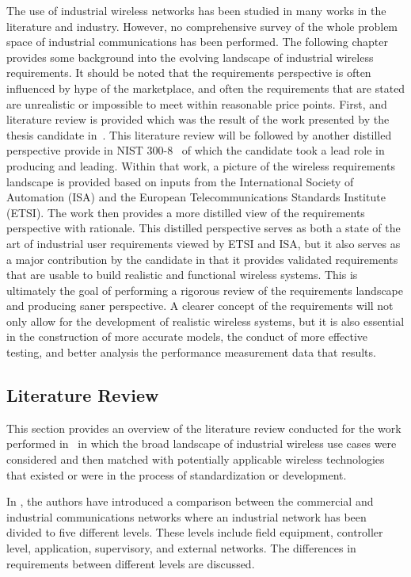 The use of industrial wireless networks has been studied in many works in the literature and industry. However, no comprehensive survey of the whole problem space of industrial communications has been performed.   The following chapter provides some background into the evolving landscape of industrial wireless requirements.  It should be noted that the requirements perspective is often influenced by hype of the marketplace, and often the requirements that are stated are unrealistic or impossible to meet within reasonable price points.  First, and literature review is provided which was the result of the work presented by the thesis candidate in~\cite{CandellRW2017}.  This literature review will be followed by another distilled perspective provide in NIST 300-8~\cite{Montgomery2019} of which the candidate took a lead role in producing and leading.  Within that work, a picture of the wireless requirements landscape is provided based on inputs from the International Society of Automation (ISA) and the European Telecommunications Standards Institute (ETSI).  The work then provides a more distilled view of the requirements perspective with rationale.  This distilled perspective serves as both a state of the art of industrial user requirements viewed by ETSI and ISA, but it also serves as a major contribution by the candidate in that it provides validated requirements that are usable to build realistic and functional wireless systems.  This is ultimately the goal of performing a rigorous review of the requirements landscape and producing saner perspective.  A clearer concept of the requirements will not only allow for the development of realistic wireless systems, but it is also essential in the construction of more accurate models, the conduct of more effective testing, and better analysis the performance measurement data that results.


\subsection{Literature Review}\label{sec:litreview:academia}

This section provides an overview of the literature review conducted for the work performed in~\cite{CandellRW2017} in which the broad landscape of industrial wireless use cases were considered and then matched with potentially applicable wireless technologies that existed or were in the process of standardization or development.  

In \cite{Galloway2013}, the authors have introduced a comparison between the commercial and industrial communications networks where an industrial network has been divided to five different levels. These levels include field equipment, controller level, application, supervisory, and external networks. The differences in requirements between different levels are discussed. 

